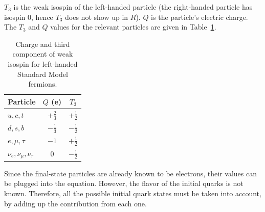 $T_3$ is the weak isospin of the left-handed particle 
(the right-handed particle has isospin 0, 
hence $T_3$ does not show up in $R$). 
$Q$ is the particle's electric charge.  
The $T_3$ and $Q$ values for the relevant particles are 
given in Table~\ref{TableWeakNumbers}.  

\begin{table}[htbp]
  \begin{center}
    \caption{Charge and third component of weak isospin for 
      left-handed Standard Model fermions.}
    \label{TableWeakNumbers}
    \begin{tabular}[]{ | l | c | c | }
      \hline
      Particle & $Q$ (e) & $T_3$  \\ \hline \hline
      $u,c,t$ & $+\frac{2}{3}$ & $+\frac{1}{2}$ \\ \hline
      $d,s,b$ & $-\frac{1}{3}$ & $-\frac{1}{2}$ \\ \hline
      $e,\mu,\tau$ & $-1$ & $+\frac{1}{2}$ \\ \hline
      $\nu_e, \nu_{\mu}, \nu_{\tau}$ & $0$ & $-\frac{1}{2}$ \\ \hline
    \end{tabular}
  \end{center}
\end{table}




Since the final-state particles are already known to be electrons, 
their values can be plugged into the equation.  
However, the flavor of the initial quarks is not known.  
Therefore, all the possible initial quark states must 
be taken into account, by adding up the contribution from each one.  





